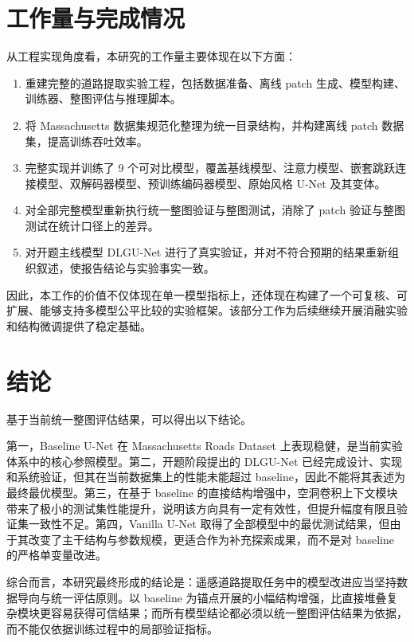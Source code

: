 \documentclass[12pt,a4paper]{ctexart}
\begin{document}
\section{工作量与完成情况}
从工程实现角度看，本研究的工作量主要体现在以下方面：
\begin{enumerate}
    \item 重建完整的道路提取实验工程，包括数据准备、离线 patch 生成、模型构建、训练器、整图评估与推理脚本。
    \item 将 Massachusetts 数据集规范化整理为统一目录结构，并构建离线 patch 数据集，提高训练吞吐效率。
    \item 完整实现并训练了 9 个可对比模型，覆盖基线模型、注意力模型、嵌套跳跃连接模型、双解码器模型、预训练编码器模型、原始风格 U-Net 及其变体。
    \item 对全部完整模型重新执行统一整图验证与整图测试，消除了 patch 验证与整图测试在统计口径上的差异。
    \item 对开题主线模型 DLGU-Net 进行了真实验证，并对不符合预期的结果重新组织叙述，使报告结论与实验事实一致。
\end{enumerate}

因此，本工作的价值不仅体现在单一模型指标上，还体现在构建了一个可复核、可扩展、能够支持多模型公平比较的实验框架。该部分工作为后续继续开展消融实验和结构微调提供了稳定基础。

\section{结论}
基于当前统一整图评估结果，可以得出以下结论。

第一，Baseline U-Net 在 Massachusetts Roads Dataset 上表现稳健，是当前实验体系中的核心参照模型。第二，开题阶段提出的 DLGU-Net 已经完成设计、实现和系统验证，但其在当前数据集上的性能未能超过 baseline，因此不能将其表述为最终最优模型。第三，在基于 baseline 的直接结构增强中，空洞卷积上下文模块带来了极小的测试集性能提升，说明该方向具有一定有效性，但提升幅度有限且验证集一致性不足。第四，Vanilla U-Net 取得了全部模型中的最优测试结果，但由于其改变了主干结构与参数规模，更适合作为补充探索成果，而不是对 baseline 的严格单变量改进。

综合而言，本研究最终形成的结论是：遥感道路提取任务中的模型改进应当坚持数据导向与统一评估原则。以 baseline 为锚点开展的小幅结构增强，比直接堆叠复杂模块更容易获得可信结果；而所有模型结论都必须以统一整图评估结果为依据，而不能仅依据训练过程中的局部验证指标。
\end{document}
